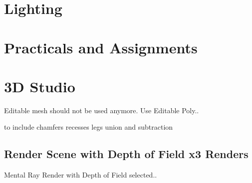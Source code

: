 \section{Lighting}















\section{Practicals and Assignments}



\section{3D Studio}




Editable mesh should not be used anymore.  Use Editable Poly..






\newpage

%

to include chamfers
recesses
legs
union and subtraction




\subsection{Render Scene with Depth of Field x3 Renders}
Mental Ray Render with Depth of Field selected..




%
%
\nocite{*}


\newpage

\printindex
\newpage






